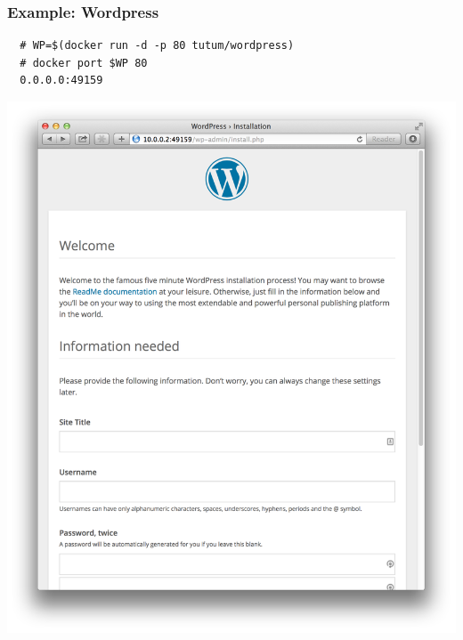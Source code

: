 \documentclass[xcolor=dvipsnames]{beamer}
\begin{document}
\begin{frame}[fragile]
  \frametitle{Example: Wordpress}
  \begin{lstlisting}
  # WP=$(docker run -d -p 80 tutum/wordpress)
  # docker port $WP 80
  0.0.0.0:49159
  \end{lstlisting}
  \includegraphics[width=\textwidth]{figures/wordpress.pdf}
\end{frame}
\end{document}
